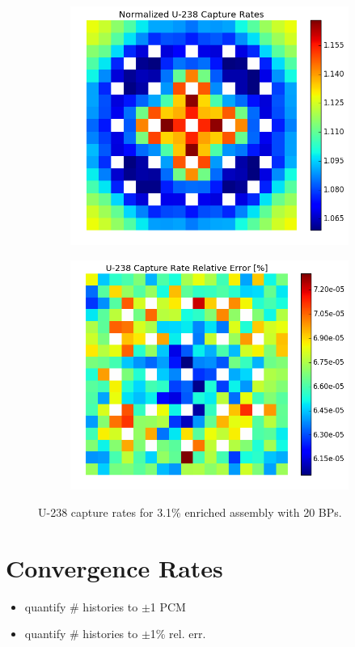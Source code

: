 \begin{figure}[h!]
\centering
\begin{subfigure}{0.5\textwidth}
  \centering
  \includegraphics[width=\linewidth]{figures/benchmarks/capture-rates/capt-mean-fuel-31-20BAs}
  \caption{}
  \label{fig:chap7-capt-rate-mean-3.1-20BAs-assm}
\end{subfigure}%
\begin{subfigure}{0.5\textwidth}
  \centering
  \includegraphics[width=\linewidth]{figures/benchmarks/capture-rates/capt-rel-err-fuel-31-20BAs}
  \caption{}
  \label{fig:chap7-capt-rate-rel-err-3.1-20BAs-assm}
\end{subfigure}%
\caption[U-238 capture rates for 3.1\% enriched assembly with 20 BPs]{U-238 capture rates for 3.1\% enriched assembly with 20 \ac{BP}s.}
\label{fig:chap7-capt-rates-3.1-assm-20BAs}
\end{figure}


\section{Convergence Rates}
\label{subsec:chap7-convergence}

\begin{itemize}[noitemsep]
  \item quantify \# histories to $\pm$1 \ac{PCM}
  \item quantify \# histories to $\pm$1\% rel. err.
\end{itemize}